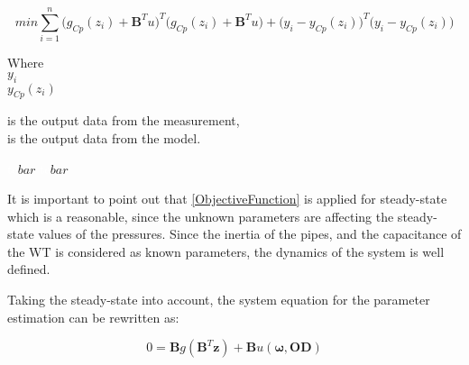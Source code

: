 %
%

 \begin{equation}
 min \sum_{i=1}^{n}\Big(g_{Cp}(z_i) + \pmb{B}^Tu\Big)^T \Big(g_{Cp}(z_i)     + \pmb{B}^Tu\Big) + \big(y_i - y_{Cp}(z_i)\big)^T  \big(y_i - y_{Cp}(z_i)\big)
  \label{ObjectiveFunction}
 \end{equation}
 
\begin{minipage}[t]{0.20\textwidth}
Where\\
\hspace*{8mm} $y_i$ \\
\hspace*{8mm} $y_{Cp}(z_i)$ 
\end{minipage}
\begin{minipage}[t]{0.68\textwidth}
\vspace*{2mm}
is the output data from the measurement,\\
is the output data from the model.
\end{minipage}
\begin{minipage}[t]{0.10\textwidth}
\vspace*{2mm}
\textcolor{White}{te}$\unit{bar}$
\textcolor{White}{te}$\unit{bar}$
\end{minipage}

It is important to point out that \eqref{ObjectiveFunction} is applied for steady-state which is a reasonable, since the unknown parameters are affecting the steady-state values of the pressures. Since the inertia of the pipes, and the capacitance of the WT is considered as known parameters, the dynamics of the system is well defined. 

Taking the steady-state into account, the system equation for the parameter estimation can be rewritten as: 

\begin{equation}
 0 = \pmb{B} g(\pmb{B}^T \pmb{z})+ \pmb{B} u(\pmb{\omega},\pmb{OD})
 \label{InputOutputmodel_steadystate}
\end{equation}



%
 
